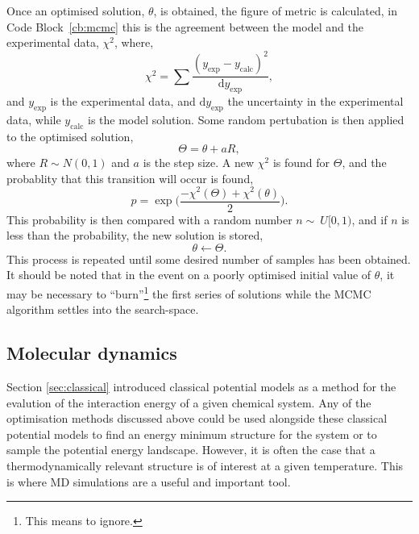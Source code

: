 Once an optimised solution, $\theta$, is obtained, the figure of metric is calculated, in Code Block~\ref{cb:mcmc} this is the agreement between the model and the experimental data, $\chi^2$, where,
%
\begin{equation}
\chi^2 = \sum\frac{(y_{\text{exp}} - y_{\text{calc}})^2}{\text{d}y_{\text{exp}}},
\end{equation}
%
and $y_{\text{exp}}$ is the experimental data, and $\text{d}y_{\text{exp}}$ the uncertainty in the experimental data, while $y_{\text{calc}}$ is the model solution.
Some random pertubation is then applied to the optimised solution,
%
\begin{equation}
\Theta = \theta + aR,
\end{equation}
%
where $R\sim N(0, 1)$ and $a$ is the step size.
A new $\chi^2$ is found for $\Theta$, and the probablity that this transition will occur is found,
%
\begin{equation}
p = \exp{\bigg(\frac{-\chi^2(\Theta) + \chi^2(\theta)}{2}\bigg)}.
\end{equation}
%
This probability is then compared with a random number $n\sim~U[0, 1)$, and if $n$ is less than the probability, the new solution is stored,
%
\begin{equation}
\theta \leftarrow \Theta.
\end{equation}
%
This process is repeated until some desired number of samples has been obtained.
It should be noted that in the event on a poorly optimised initial value of $\theta$, it may be necessary to ``burn''\footnote{This means to ignore.} the first series of solutions while the MCMC algorithm settles into the search-space.

\subsection{Molecular dynamics}
\label{sec:md}
Section \ref{sec:classical} introduced classical potential models as a method for the evalution of the interaction energy of a given chemical system.
Any of the optimisation methods discussed above could be used alongside these classical potential models to find an energy minimum structure for the system or to sample the potential energy landscape.
However, it is often the case that a thermodynamically relevant structure is of interest at a given temperature.
This is where MD simulations are a useful and important tool.

